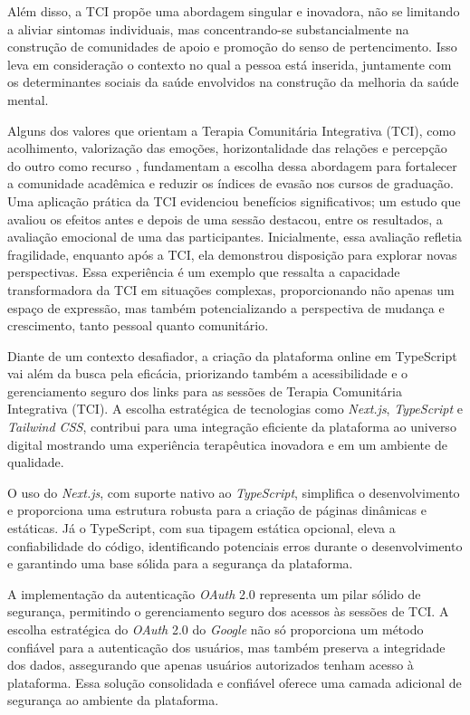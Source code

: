 Além disso, a TCI propõe uma abordagem singular e inovadora, não se limitando a aliviar sintomas individuais, mas concentrando-se substancialmente na construção de comunidades de apoio e promoção do senso de pertencimento\cite{BARRETO}. Isso leva em consideração o contexto no qual a pessoa está inserida, juntamente com os determinantes sociais da saúde envolvidos na construção da melhoria da saúde mental.

Alguns dos valores que orientam a Terapia Comunitária Integrativa (TCI), como acolhimento, valorização das emoções, horizontalidade das relações e percepção do outro como recurso  \cite{SILVA}, fundamentam a escolha dessa abordagem para fortalecer a comunidade acadêmica e reduzir os índices de evasão nos cursos de graduação. Uma aplicação prática da TCI evidenciou benefícios significativos; um estudo que avaliou os efeitos antes e depois de uma sessão destacou, entre os resultados, a avaliação emocional de uma das participantes. Inicialmente, essa avaliação refletia fragilidade, enquanto após a TCI, ela demonstrou disposição para explorar novas perspectivas\cite{LEITEePALOS}. Essa experiência é um exemplo que ressalta a capacidade transformadora da TCI em situações complexas, proporcionando não apenas um espaço de expressão, mas também potencializando a perspectiva de mudança e crescimento, tanto pessoal quanto comunitário.

Diante de um contexto desafiador, a criação da plataforma online em TypeScript vai além da busca pela eficácia, priorizando também a acessibilidade e o gerenciamento seguro dos links para as sessões de Terapia Comunitária Integrativa (TCI). A escolha estratégica de tecnologias como \textit{Next.js}, \textit{TypeScript} e \textit{Tailwind CSS}, contribui para uma integração eficiente da plataforma ao universo digital mostrando uma experiência terapêutica inovadora e em um ambiente de qualidade.

O uso do \textit{Next.js}, com suporte nativo ao \textit{TypeScript}, simplifica o desenvolvimento e proporciona uma estrutura robusta para a criação de páginas dinâmicas e estáticas. Já o TypeScript, com sua tipagem estática opcional, eleva a confiabilidade do código, identificando potenciais erros durante o desenvolvimento e garantindo uma base sólida para a segurança da plataforma.

A implementação da autenticação \textit{OAuth} 2.0 representa um pilar sólido de segurança, permitindo o gerenciamento seguro dos acessos às sessões de TCI. A escolha estratégica do \textit{OAuth} 2.0 do \textit{Google} não só proporciona um método confiável para a autenticação dos usuários, mas também preserva a integridade dos dados, assegurando que apenas usuários autorizados tenham acesso à plataforma. Essa solução consolidada e confiável oferece uma camada adicional de segurança ao ambiente da plataforma.

